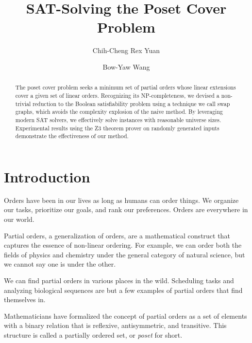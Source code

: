 \documentclass[12pt]{llncs}
\begin{document}
\title{SAT-Solving the Poset Cover Problem}

\author{Chih-Cheng Rex Yuan \and
        Bow-Yaw Wang}


\maketitle

\begin{abstract}
The poset cover problem seeks a minimum set of partial orders whose linear extensions cover a given set of linear orders. Recognizing its NP-completeness, we devised a non-trivial reduction to the Boolean satisfiability problem using a technique we call swap graphs, which avoids the complexity explosion of the naive method. By leveraging modern SAT solvers, we effectively solve instances with reasonable universe sizes. Experimental results using the Z3 theorem prover on randomly generated inputs demonstrate the effectiveness of our method.
\end{abstract}

\section{Introduction}

Orders have been in our lives as long as humans can order things. We organize our tasks, prioritize our goals, and rank our preferences. Orders are everywhere in our world.

Partial orders, a generalization of orders, are a mathematical construct that captures the essence of non-linear ordering. For example, we can order both the fields of physics and chemistry under the general category of natural science, but we cannot say one is under the other.

We can find partial orders in various places in the wild. Scheduling tasks and analyzing biological sequences are but a few examples of partial orders that find themselves in\cite{heath2013poset,fernandez2013mining}.

Mathematicians have formalized the concept of partial orders as a set of elements with a binary relation that is reflexive, antisymmetric, and transitive. This structure is called a partially ordered set, or \emph{poset} for short.
\end{document}
